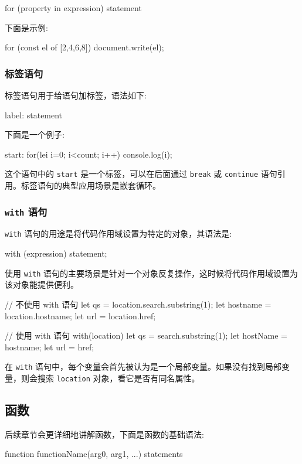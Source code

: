 \begin{JavaScript}
for (property in expression) statement
\end{JavaScript}

下面是示例:

\begin{JavaScript}
for (const el of [2,4,6,8]) {
    document.write(el);
}
\end{JavaScript}

\subsubsection{标签语句}

标签语句用于给语句加标签，语法如下:
\begin{JavaScript}
label: statement
\end{JavaScript}
下面是一个例子:
\begin{JavaScript}
start: for(lei i=0; i<count; i++) {
    console.log(i);
}
\end{JavaScript}

这个语句中的 \texttt{start} 是一个标签，可以在后面通过 \texttt{break} 或 \texttt{continue} 语句引用。标签语句的典型应用场景是嵌套循环。

\subsubsection{\texttt{with} 语句}

\texttt{with} 语句的用途是将代码作用域设置为特定的对象，其语法是:

\begin{JavaScript}
with (expression) statement;
\end{JavaScript}

使用 \texttt{with} 语句的主要场景是针对一个对象反复操作，这时候将代码作用域设置为该对象能提供便利。

\begin{JavaScript}
// 不使用 with 语句
let qs = location.search.substring(1);
let hostname = location.hostname;
let url = location.href;

// 使用 with 语句
with(location) {
    let qs = search.substring(1);
    let hostName = hostname;
    let url = href;
}
\end{JavaScript}

在 \texttt{with} 语句中，每个变量会首先被认为是一个局部变量。如果没有找到局部变量，则会搜索 \texttt{location} 对象，看它是否有同名属性。


\subsection{函数}

后续章节会更详细地讲解函数，下面是函数的基础语法:

\begin{JavaScript}
function functionName(arg0, arg1, ...) {
    statements
}
\end{JavaScript}

\newpage
